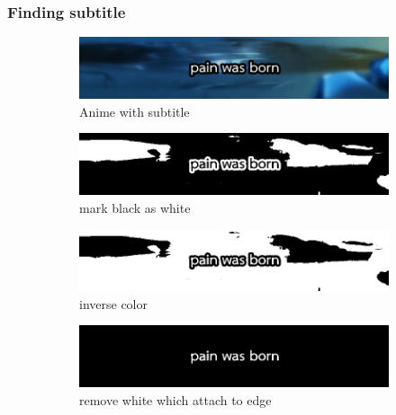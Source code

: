 \documentclass[xcolor=dvipsnames, xetex,serif]{beamer}
\begin{document}
    \begin{frame}
        \frametitle{Finding subtitle}
        \begin{figure}[H]
            \begin{subfigure}{0.4\linewidth}
                \centering
                \includegraphics[width=0.8\linewidth]{images/subtitle_detection/detection-original.png}
                \caption{Anime with subtitle}
            \end{subfigure}
            \begin{subfigure}{0.4\linewidth}
                \centering
                \includegraphics[width=0.8\linewidth]{images/subtitle_detection/detection-threshold.png}
                \caption{mark black as white}
            \end{subfigure}
            \begin{subfigure}{0.4\linewidth}
                \centering
                \includegraphics[width=0.8\linewidth]{images/subtitle_detection/detection-inverse.png}
                \caption{inverse color}
            \end{subfigure}
            \begin{subfigure}{0.4\linewidth}
                \centering
                \includegraphics[width=0.8\linewidth]{images/subtitle_detection/detection-blackfill.png}
                \caption{remove white which attach to edge}
            \end{subfigure}
            \begin{subfigure}{0.4\linewidth}

\end{subfigure}
\end{figure}
\end{frame}
\end{document}
